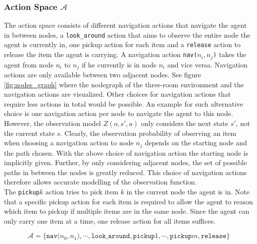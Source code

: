 \subsubsection{Action Space $\mathcal{A}$}
The action space consists of different navigation actions that navigate the agent in between nodes, a \texttt{look\_around} action that aims to observe the entire node the agent is currently in, one pickup action for each item and a \texttt{release} action to release the item the agent is carrying. A navigation action \texttt{nav($n_i, n_j$)} takes the agent from node $n_i$ to $n_j$ if he currently is in node $n_i$ and vice versa. Navigation actions are only available between two adjacent nodes. See figure \ref{fig:nodes_graph} where the nodegraph of the three-room environment and the navigation actions are visualized. Other choices for navigation actions that require less actions in total would be possible. An example for such alternative choice is one navigation action per node to navigate the agent to this node. However, the observation model $Z(o, s', a)$ only considers the next state $s'$, not the current state $s$. Clearly, the observation probability of observing an item when choosing a navigation action to node $n_j$ depends on the starting node and the path chosen. With the above choice of navigation action the starting node is implicitly given. Further, by only considering adjacent nodes, the set of possible paths in between the nodes is greatly reduced. This choice of navigation actions therefore allows accurate modelling of the observation function.\\
The \texttt{pickup$k$} action tries to pick item $k$ in the current node the agent is in. Note that a specific pickup action for each item is required to allow the agent to reason which item to pickup if multiple items are in the same node. Since the agent can only carry one item at a time, one release action for all items suffices. 

\begin{equation}
    \mathcal{A} = \{\texttt{nav($n_0, n_1$)}, \cdots, \texttt{look\_around}, \texttt{pickup$1$}, \cdots, \texttt{pickup$m$}, \texttt{release}\}
\end{equation}

